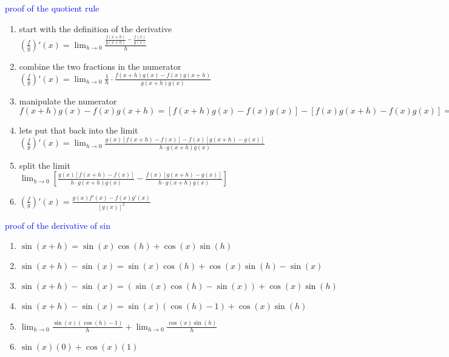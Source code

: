 \documentclass{article}
\begin{document}
\textcolor{blue}{proof of the quotient rule}
	\begin{enumerate}
		\item start with the definition of the derivative\\ $(\frac{f}{g})'(x) = \lim_{h \to 0}\frac{\frac{f(x + h)}{g(x + h)} - \frac{f(x)}{g(x)}}{h}$
		\item combine the two fractions in the numerator\\ $(\frac{f}{g})'(x) = \lim_{h \to 0} \frac{1}{h} \cdot \frac{f(x + h)g(x) - f(x)g(x + h)}{g(x + h)g(x)}$    
		\item manipulate the numerator\\ $f(x + h)g(x) - f(x)g(x + h) = [f(x + h)g(x) - f(x)g(x)] - [f(x)g(x + h) - f(x)g(x)] = g(x)[f(x + h) - f(x)] - f(x)[g(x + h) - g(x)]$
		\item lets put that back into the limit\\ $(\frac{f}{g})'(x) = \lim_{h \to 0}\frac{g(x)[f(x + h) - f(x)] - f(x)[g(x + h) - g(x)]}{h \cdot g(x + h)g(x)}$ 
		\item split the limit\\ $\lim_{h \to 0}[\frac{g(x)[f(x + h) - f(x)]}{h \cdot g(x + h)g(x)} - \frac{f(x)[g(x + h) - g(x)]}{h \cdot g(x + h)g(x)}]$\\
		\item $(\frac{f}{g})'(x) = \frac{g(x)f'(x) - f(x)g'(x)}{[g(x)]^2}$ 
	\end{enumerate}

\textcolor{blue}{proof of the derivative of sin}
	\begin{enumerate}
		\item $\sin(x + h) = \sin(x)\cos(h) + \cos(x)\sin(h)$
		\item $\sin(x + h) - \sin(x) = \sin(x)\cos(h) + \cos(x)\sin(h) - \sin(x)$ 
		\item $\sin(x + h) - \sin(x) = (\sin(x)\cos(h) - \sin(x)) + \cos(x)\sin(h)$ 
		\item $\sin(x + h) - \sin(x) = \sin(x)(\cos(h) - 1) + \cos(x)\sin(h)$ 
		\item $\lim_{h \to 0}\frac{\sin(x)(\cos(h) - 1)}{h} + \lim_{h \to 0}\frac{\cos(x)\sin(h)}{h}$
		\item $\sin(x)(0) + \cos(x)(1)$
	\end{enumerate}
\end{document}
